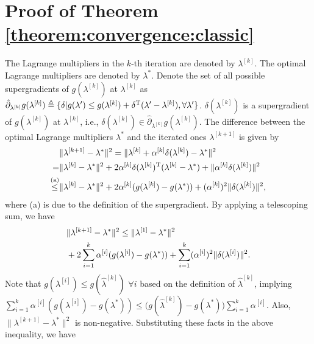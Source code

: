 \documentclass[journal]{IEEEtran}
\begin{document}
\section{Proof of Theorem \ref{theorem:convergence:classic}}\label{appendix:proof:theorem:convergence:classic}
The Lagrange multipliers in the $k$-th iteration are denoted by $\lambda^{[k]}$. The optimal Lagrange multipliers are denoted by $\lambda^*$.
Denote the set of all possible supergradients of $g(\lambda^{[k]})$ at $\lambda^{[k]}$ as $\hat{\partial}_{\lambda^{[k]}} g(\lambda^{[k]}) \triangleq \{\delta| g(\lambda')\leq g(\lambda^{[k]}) + \delta^{\rm T}(\lambda'-\lambda^{[k]}), \forall \lambda'\}$.
$\delta(\lambda^{[k]})$ is a supergradient of $g(\lambda^{[k]})$ at $\lambda^{[k]}$, i.e., $ \delta(\lambda^{[k]}) \in \hat{\partial}_{\lambda^{[k]}}  g(\lambda^{[k]})$.
The difference between the optimal Lagrange multipliers $\lambda^*$ and the iterated ones $\lambda^{[k+1]}$ is given by
\begin{equation}
  \begin{aligned}
    &\|\lambda^{[k+1]} - \lambda^*\|^2 = \|\lambda^{[k]} + \alpha^{[k]} \delta(\lambda^{[k]}) - \lambda^*\|^2\\
  = &\|\lambda^{[k]} - \lambda^*\|^2 + 2\alpha^{[k]}\delta(\lambda^{[k]})^{\rm T} (\lambda^{[k]} - \lambda^*) + \|\alpha^{[k]}\delta(\lambda^{[k]})\|^2\\
\stackrel{\text{(a)}}{\leq}
    &\|\lambda^{[k]} - \lambda^*\|^2 + 2\alpha^{[k]} (g(\lambda^{[k]}) - g(\lambda^*)) + (\alpha^{[k]})^2 \|\delta(\lambda^{[k]})\|^2,
  \end{aligned}
  \notag
\end{equation}
where (a) is due to the definition of the supergradient. By applying a telescoping sum, we have
\begin{equation}
  \begin{aligned}
    &\|\lambda^{[k+1]} - \lambda^*\|^2 \leq \|\lambda^{[1]} - \lambda^*\|^2 \\
    &+ 2 \sum_{i=1}^{k}\alpha^{[i]} (g(\lambda^{[i]}) - g(\lambda^*)) + \sum_{i=1}^{k}(\alpha^{[i]})^2 \|\delta(\lambda^{[i]})\|^2.
  \end{aligned}
  \notag
\end{equation}
Note that $g(\lambda^{[i]})\leq g(\hat{\lambda}^{[k]})$ $\forall i$ based on the definition of $\hat{\lambda}^{[k]}$, implying $\sum_{i=1}^{k}\alpha^{[i]} (g(\lambda^{[i]}) - g(\lambda^*)) \leq  \big(g(\hat{\lambda}^{[k]}) - g(\lambda^*)\big)\sum_{i=1}^{k}\alpha^{[i]}$.
Also, $\|\lambda^{[k+1]} - \lambda^*\|^2$ is non-negative. Substituting these facts in the above inequality, we have
\end{document}
